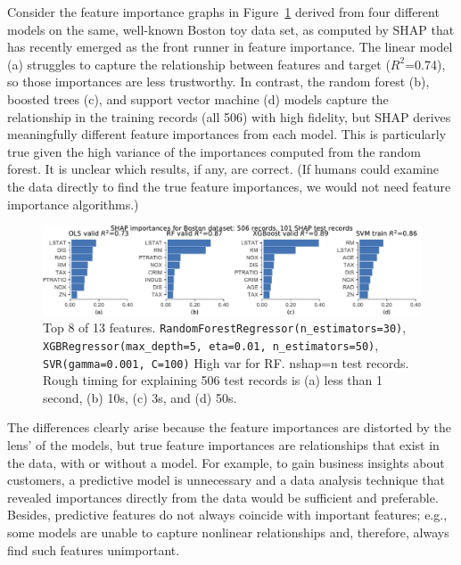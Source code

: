 \documentclass[12pt]{article}
\newcommand{\figref}[1]{Figure~\ref{#1}}
\newcommand{\todo}[1]{{{\color{red}{[#1]}}}}
\begin{document}
Consider the feature importance graphs in \figref{fig:diff-models} derived from four different models on the same, well-known Boston toy data set, as computed by SHAP \cite{shap} that has recently emerged as the front runner in feature importance. The linear model (a) struggles to capture the relationship between features and target ($R^2$=0.74), so those importances are less trustworthy.  In contrast, the random forest (b), boosted trees (c), and support vector machine (d) models capture the relationship in the training records (all 506) with high fidelity, but SHAP derives meaningfully different feature importances from each model.  This is particularly true given the high variance of the importances computed from the random forest. \todo{explain that} It is unclear which results, if any, are correct. (If humans could examine the data directly to find the true feature importances, we would not need feature importance algorithms.)

\begin{figure}[htbp]
\begin{center}
\includegraphics[scale=0.6]{images/diff-models.pdf}
\caption{Top 8 of 13 features. {\tt\footnotesize RandomForestRegressor(n\_estimators=30)}, {\tt\footnotesize XGBRegressor(max\_depth=5, eta=0.01, n\_estimators=50)}, {\tt\footnotesize SVR(gamma=0.001, C=100)} High var for RF. nshap=n test records. Rough timing for explaining 506 test records is (a) less than 1 second, (b) 10s, (c) 3s, and (d) 50s.}
\label{fig:diff-models}
\end{center}
\end{figure}

The differences clearly arise because the feature importances are distorted by the lens' of the models, but true feature importances are relationships that exist in the data, with or without a model.  For example, to gain business insights about customers, a predictive model is unnecessary and a data analysis technique that revealed importances directly from the data would be sufficient and preferable.  Besides, predictive features do not always coincide with important features; e.g., some models are unable to capture nonlinear relationships and, therefore, always find such features unimportant.  \todo{last bit redundant?}
 
\end{document}
